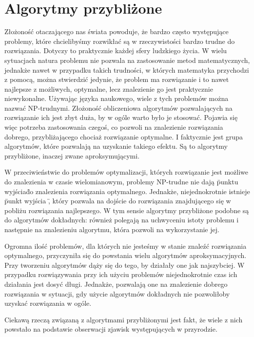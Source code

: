 \chapter{Algorytmy przybliżone}
\label{cha:algorytmy}

Złożoność otaczającego nas świata powoduje, że bardzo często występujące problemy, które chcielibyśmy rozwikłać są w rzeczywistości bardzo trudne do rozwiązania. Dotyczy to praktycznie każdej sfery ludzkiego życia. W wielu sytuacjach natura problemu nie pozwala na zastosowanie metod matematycznych, jednakże nawet w przypadku takich trudności, w których matematyka przychodzi z pomocą, można stwierdzić jedynie, że problem ma rozwiązanie i to nawet najlepsze z możliwych, optymalne, lecz znalezienie go jest praktycznie niewykonalne. Używając języka naukowego, wiele z tych problemów można nazwać NP-trudnymi. Złożoność obliczeniowa algorytmów pozwalających na rozwiązanie ich jest zbyt duża, by w ogóle warto było je stosować. Pojawia się więc potrzeba zastosowania czegoś, co pozwoli na znalezienie rozwiązania dobrego, przybliżającego chociaż rozwiązanie optymalne. I faktycznie jest grupa algorytmów, które pozwalają na uzyskanie takiego efektu. Są to algorytmy przybliżone, inaczej zwane aproksymującymi.

W przeciwieństwie do problemów optymalizacji, których rozwiązanie jest możliwe do znalezienia w czasie wielomianowym, problemy NP-trudne nie dają \" punktu wyjścia\" do znalezienia rozwiązania optymalnego. Jednakże, niejednokrotnie istnieje \"punkt wyjścia \", który pozwala na dojście do rozwiązania znajdującego się w pobliżu rozwiązania najlepszego. W tym sensie algorytmy przybliżone podobne są do algorytmów dokładnych: również polegają na uchwyceniu istoty problemu i następnie na znalezieniu algorytmu, która pozwoli na wykorzystanie jej.

Ogromna ilość problemów, dla których nie jesteśmy w stanie znaleźć rozwiązania optymalnego, przyczyniła się do powstania wielu algorytmów aproksymacyjnych.  Przy tworzeniu algorytmów dąży się do tego, by działały one jak najszybciej. W przypadku rozwiązywania przy ich użyciu problemów niejednokrotnie czas ich działania jest dosyć długi. Jednakże, pozwalają one na znalezienie dobrego rozwiązania w sytuacji, gdy użycie algorytmów dokładnych nie pozwoliłoby uzyskać rozwiązania w ogóle.

Ciekawą rzeczą związaną z algorytmami przybliżonymi jest fakt, że wiele z nich powstało na podstawie obserwacji zjawisk występujących w przyrodzie.

